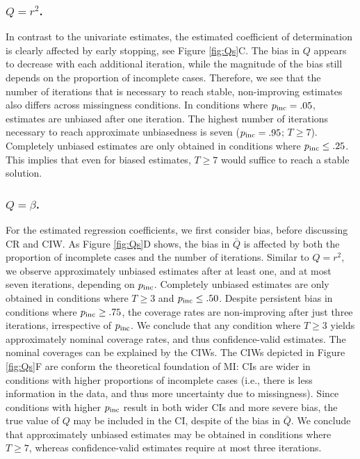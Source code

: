 \documentclass[Royal,times,sageh]{sagej}
\begin{document}
\hypertarget{qr2.}{%
\subsubsection{\texorpdfstring{\(Q=r^2\).}{Q=r\^{}2.}}\label{qr2.}}

In contrast to the univariate estimates, the estimated coefficient of determination is clearly affected by early stopping, see Figure \ref{fig:Qs}C. The bias in \(Q\) appears to decrease with each additional iteration, while the magnitude of the bias still depends on the proportion of incomplete cases. Therefore, we see that the number of iterations that is necessary to reach stable, non-improving estimates also differs across missingness conditions. In conditions where \(p_{\rm inc}=.05\), estimates are unbiased after one iteration. The highest number of iterations necessary to reach approximate unbiasedness is seven (\(p_{\rm inc}=.95\); \(T\geq7\)). Completely unbiased estimates are only obtained in conditions where \(p_{\rm inc}\leq.25\). This implies that even for biased estimates, \(T\geq7\) would suffice to reach a stable solution.

\hypertarget{qbeta.}{%
\subsubsection{\texorpdfstring{\(Q=\beta\).}{Q=\textbackslash beta.}}\label{qbeta.}}

For the estimated regression coefficients, we first consider bias, before discussing CR and CIW. As Figure \ref{fig:Qs}D shows, the bias in \(\bar{Q}\) is affected by both the proportion of incomplete cases and the number of iterations. Similar to \(Q=r^2\), we observe approximately unbiased estimates after at least one, and at most seven iterations, depending on \(p_{\rm inc}\). Completely unbiased estimates are only obtained in conditions where \(T\geq3\) and \(p_{\rm inc}\leq .50\). Despite persistent bias in conditions where \(p_{\rm inc}\geq.75\), the coverage rates are non-improving after just three iterations, irrespective of \(p_{\rm inc}\). We conclude that any condition where \(T\geq3\) yields approximately nominal coverage rates, and thus confidence-valid estimates.
The nominal coverages can be explained by the CIWs. The CIWs depicted in Figure \ref{fig:Qs}F are conform the theoretical foundation of MI: CIs are wider in conditions with higher proportions of incomplete cases (i.e., there is less information in the data, and thus more uncertainty due to missingness). Since conditions with higher \(p_{\rm inc}\) result in both wider CIs and more severe bias, the true value of \(Q\) may be included in the CI, despite of the bias in \(\bar{Q}\).
We conclude that approximately unbiased estimates may be obtained in conditions where \(T\geq7\), whereas confidence-valid estimates require at most three iterations.
\end{document}
